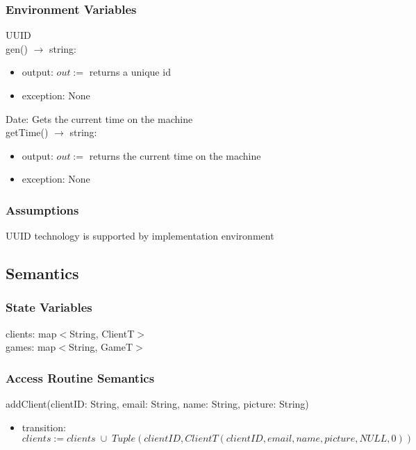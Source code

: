\documentclass[12pt, titlepage]{article}
\begin{document}
\subsubsection{Environment Variables}

UUID\\
gen() $\rightarrow$ string:
\begin{itemize}
    \item output: $out := $ returns a unique id
    \item exception:    None
\end{itemize}

Date: Gets the current time on the machine\\
getTime() $\rightarrow$ string:
\begin{itemize}
    \item output: $out := $ returns the current time on the machine
    \item exception:    None
\end{itemize}

\subsubsection{Assumptions}

UUID technology is supported by implementation environment


\subsection{Semantics}

\subsubsection{State Variables}

clients: map$<$String, ClientT$>$ \\
games: map$<$String, GameT$>$


\subsubsection{Access Routine Semantics}

\noindent addClient(clientID: String, email: String, name: String, picture: String)
\begin{itemize}
\item transition:$clients := clients \;\cup\;  Tuple(clientID, ClientT(clientID, email, name, picture, NULL, 0))$ \\
\end{itemize}
\end{document}
